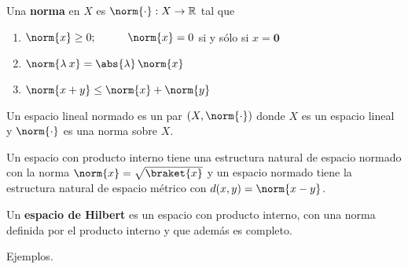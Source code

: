 \begin{defi}
Una \textbf{norma} en $X$ es $\norm{\cdot} : X \rightarrow \mathbb{R}$ tal que  
\begin{enumerate}[label=\roman*.]
\item $\norm{x} \geq 0; \hspace{1cm} \norm{x} = 0$ si y sólo si $x = \bm{0}$
\item $\norm{\lambda \: x} =  \abs{\lambda} \, \norm{x}$
\item $\norm{x + y} \leq \norm{x} + \norm{y}$
\end{enumerate}
\end{defi}
 Un espacio lineal normado es un par $(X, \norm{\cdot})$ donde $X$ es un espacio lineal y $\norm{\cdot}$ es una norma sobre $X$.
 \par
 Un espacio con producto interno tiene una estructura natural de espacio normado con la norma $\norm{x} = \sqrt{\braket{x}}$ y un espacio normado tiene la estructura natural de espacio métrico con $d(x, y) = \norm{x - y}$.

Un \textbf{espacio de Hilbert} es un espacio con producto interno, con una norma definida por el producto interno y que además es completo.
\par
Ejemplos.

